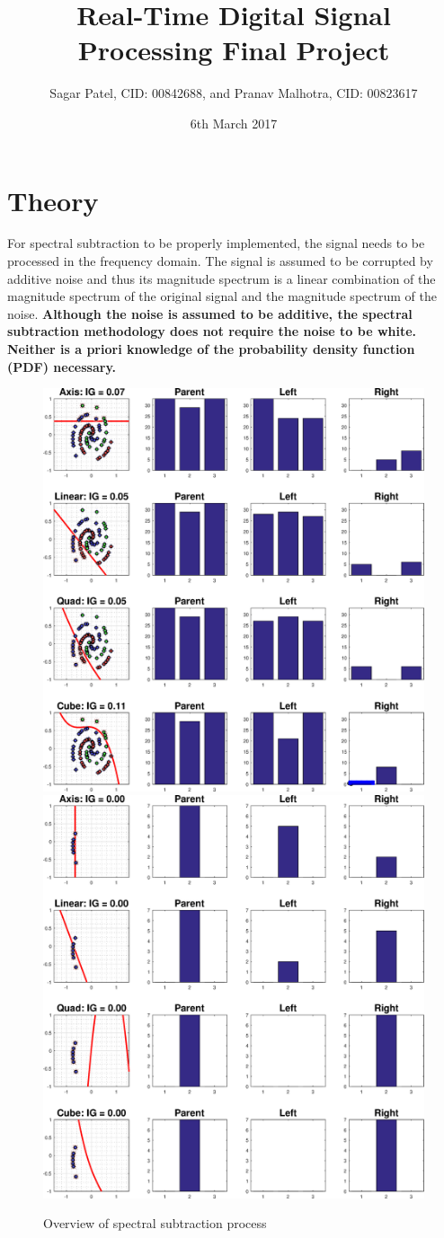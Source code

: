 \documentclass[a4paper,pra,twocolumn,10pt,aps,longbibliography,nobalancelastpage]{revtex4-1}
\begin{document}
\title{Real-Time Digital Signal Processing Final Project}
\author{Sagar Patel, CID: 00842688, and Pranav Malhotra, CID: 00823617}
\date{6th March 2017}

\maketitle
\section{Theory}\label{sec:theory} 
For spectral subtraction to be properly implemented, the signal needs to be processed in the frequency domain. The signal is assumed to be corrupted by additive noise and thus its magnitude spectrum is a linear combination of the magnitude spectrum of the original signal and the magnitude spectrum of the noise. \textbf{Although the noise is assumed to be additive, the spectral subtraction methodology does not require the noise to be white. Neither is a priori knowledge of the probability density function (PDF) necessary.}

\begin{figure}[H]
    \includegraphics[width=0.49\columnwidth]{split_function_visualitions_1}
    \includegraphics[width=0.49\columnwidth]{split_function_visualitions_2}
    \caption{Overview of spectral subtraction process}
    \label{fig:spec_sub_overview}
\end{figure}
\end{document}
